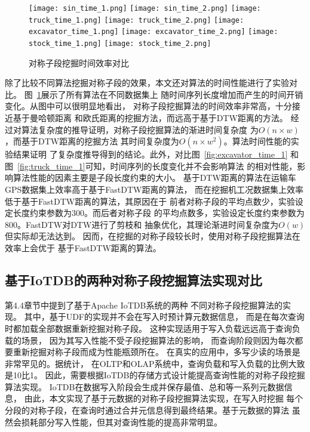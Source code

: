 \begin{figure}
  \centering
  {\texttt{[image: sin\_time\_1.png]}}
  {\texttt{[image: sin\_time\_2.png]}}
  {\texttt{[image: truck\_time\_1.png]}}
  {\texttt{[image: truck\_time\_2.png]}}
  {\texttt{[image: excavator\_time\_1.png]}}
  {\texttt{[image: excavator\_time\_2.png]}}
  {\texttt{[image: stock\_time\_1.png]}}
  {\texttt{[image: stock\_time\_2.png]}}
  \caption{对称子段挖掘时间效率对比}
  \label{fig:segement_algorithm_time}
\end{figure}

除了比较不同算法挖掘对称子段的效果，本文还对算法的时间性能进行了实验对比。
图~\ref{fig:segement_algorithm_time}展示了所有算法在不同数据集上
随时间序列长度增加而产生的时间开销变化。从图中可以很明显地看出，
对称子段挖掘算法的时间效率非常高，十分接近基于曼哈顿距离
和欧氏距离的挖掘方法，而远高于基于DTW距离的方法。
经过对算法复杂度的推导证明，对称子段挖掘算法的渐进时间复杂度
为$O\left(n \times w\right)$，而基于DTW距离的挖掘方法
其时间复杂度为$O\left(n \times w^2\right)$。算法时间性能的实验结果证明
了复杂度推导得到的结论。此外，对比图~\ref{fig:excavator_time_1}
和图~\ref{fig:truck_time_1}可知，时间序列的长度变化并不会影响算法
的相对性能，影响算法性能的因素主要是子段长度约束的大小。
基于DTW距离的算法在运输车GPS数据集上效率高于基于FastDTW距离的算法，
而在挖掘机工况数据集上效率低于基于FastDTW距离的算法，其原因在于
前者对称子段的平均点数少，实验设定长度约束参数为300。而后者对称子段
的平均点数多，实验设定长度约束参数为800。FastDTW对DTW进行了剪枝和
抽象优化\cite{DBLP:journals/ida/SalvadorC07}，其理论渐进时间复杂度为$O\left(w\right)$但实际却无法达到。
因而，在挖掘的对称子段较长时，使用对称子段挖掘算法在效率上会优于
基于FastDTW距离的算法。

\subsection{基于IoTDB的两种对称子段挖掘算法实现对比}
第4.4章节中提到了基于Apache IoTDB系统的两种
不同对称子段挖掘算法的实现。
其中，基于UDF的实现并不会在写入时预计算元数据信息，
而是在每次查询时都加载全部数据重新挖掘对称子段。
这种实现适用于写入负载远远高于查询负载的场景，
因为其写入性能不受子段挖掘算法的影响，
而查询阶段则因为每次都要重新挖掘对称子段而成为性能瓶颈所在。
在真实的应用中，多写少读的场景是非常罕见的。据统计，
在OLTP和OLAP系统中，查询负载和写入负载的比例大致是10比1。
因此，需要根据IoTDB的存储方式设计能提高查询性能的对称子段挖掘算法实现。
IoTDB在数据写入阶段会生成并保存最值、总和等一系列元数据信息，
由此，本文实现了基于元数据的对称子段挖掘算法实现，在写入时挖掘
每个分段的对称子段，在查询时通过合并元信息得到最终结果。基于元数据的算法
虽然会损耗部分写入性能，但其对查询性能的提高非常明显。

